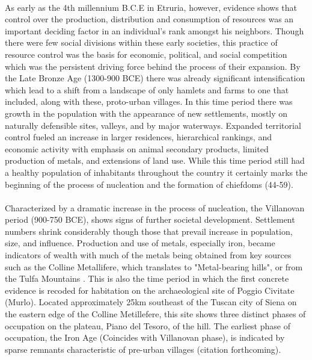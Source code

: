 \documentclass[12pt,a4paper]{thesis}
\begin{document}
\paragraph{}
As early as the 4th millennium B.C.E in Etruria, however, evidence shows that control over the production, distribution and consumption of resources was an important deciding factor in an individual's rank amongst his neighbors. Though there were few social divisions within these early societies, this practice of resource control was the basis for economic, political, and social competition which was the persistent driving force behind the process of their expansion. By the Late Bronze Age (1300-900 BCE) there was already significant intensification which lead to a shift from a landscape of only hamlets and farms to one that included, along with these, proto-urban villages. In this time period there was growth in the population with the appearance of new settlements, mostly on naturally defensible sites, valleys, and by major waterways. Expanded  territorial control fueled an increase in larger residences, hierarchical rankings, and economic activity with emphasis on animal secondary products, limited production of metals, and extensions of land use. While this time period still had a healthy population of inhabitants throughout the country it certainly marks the beginning of the process of nucleation and the formation of chiefdoms (44-59).

\paragraph{}  
Characterized by a dramatic increase in the process of nucleation, the Villanovan period (900-750 BCE), shows signs of further societal development.  Settlement numbers shrink considerably though those that prevail increase in population, size, and influence. Production and use of metals, especially iron, became indicators of wealth with much of the metals being obtained from key sources such as the Colline Metallifere, which translates to "Metal-bearing hills", or from the Tulfa Mountains \cite[75-77]{SpiSto92}. This is also the time period in which the first concrete evidence is recoded for habitation on the archaeological site of Poggio Civitate (Murlo). Located approximately 25km southeast of the Tuscan city of Siena on the eastern edge of the Colline Metillefere, this site shows three distinct phases of occupation on the plateau, Piano del Tesoro, of the hill. The earliest phase of occupation, the Iron Age (Coincides with Villanovan phase), is indicated by sparse remnants characteristic of pre-urban villages (citation forthcoming).
\end{document}
